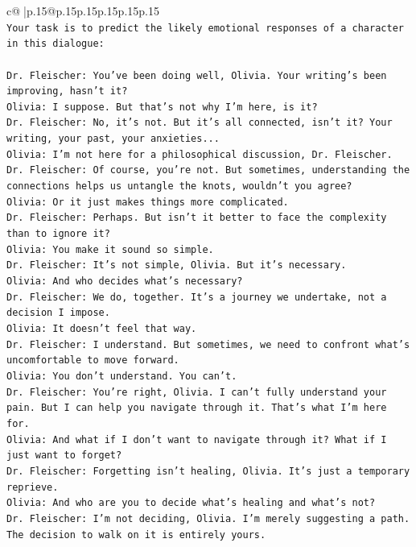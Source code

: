 \documentclass{article}
\begin{document}
{\begin{supertabular}{c@{$\;$}|p{.15\linewidth}@{}p{.15\linewidth}p{.15\linewidth}p{.15\linewidth}p{.15\linewidth}p{.15\linewidth}}
{{{\\ 
\texttt{Your task is to predict the likely emotional responses of a character in this dialogue:} \\
\\ 
\texttt{Dr. Fleischer: You've been doing well, Olivia. Your writing's been improving, hasn't it?} \\
\texttt{Olivia: I suppose. But that's not why I'm here, is it?} \\
\texttt{Dr. Fleischer: No, it's not. But it's all connected, isn't it? Your writing, your past, your anxieties...} \\
\texttt{Olivia: I'm not here for a philosophical discussion, Dr. Fleischer.} \\
\texttt{Dr. Fleischer: Of course, you're not. But sometimes, understanding the connections helps us untangle the knots, wouldn't you agree?} \\
\texttt{Olivia: Or it just makes things more complicated.} \\
\texttt{Dr. Fleischer: Perhaps. But isn't it better to face the complexity than to ignore it?} \\
\texttt{Olivia: You make it sound so simple.} \\
\texttt{Dr. Fleischer: It's not simple, Olivia. But it's necessary.} \\
\texttt{Olivia: And who decides what's necessary?} \\
\texttt{Dr. Fleischer: We do, together. It's a journey we undertake, not a decision I impose.} \\
\texttt{Olivia: It doesn't feel that way.} \\
\texttt{Dr. Fleischer: I understand. But sometimes, we need to confront what's uncomfortable to move forward.} \\
\texttt{Olivia: You don't understand. You can't.} \\
\texttt{Dr. Fleischer: You're right, Olivia. I can't fully understand your pain. But I can help you navigate through it. That's what I'm here for.} \\
\texttt{Olivia: And what if I don't want to navigate through it? What if I just want to forget?} \\
\texttt{Dr. Fleischer: Forgetting isn't healing, Olivia. It's just a temporary reprieve.} \\
\texttt{Olivia: And who are you to decide what's healing and what's not?} \\
\texttt{Dr. Fleischer: I'm not deciding, Olivia. I'm merely suggesting a path. The decision to walk on it is entirely yours.} \\
}}}
\end{supertabular}}
\end{document}

